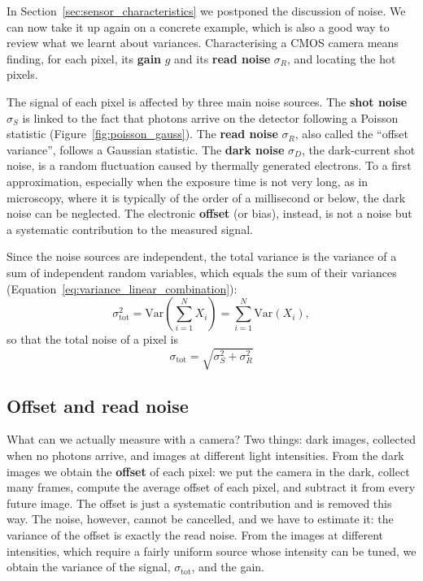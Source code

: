 \documentclass[letterpaper,11pt,leqno]{book}
\begin{document}
In Section~\ref{sec:sensor_characteristics} we postponed the discussion of noise. We can now take it up again on a concrete example, which is also a good way to review what we learnt about variances. Characterising a CMOS camera means finding, for each pixel, its \textbf{gain} $g$ and its \textbf{read noise} $\sigma_R$, and locating the hot pixels.

The signal of each pixel is affected by three main noise sources. The \textbf{shot noise} $\sigma_S$ is linked to the fact that photons arrive on the detector following a Poisson statistic (Figure~\ref{fig:poisson_gauss}). The \textbf{read noise} $\sigma_R$, also called the ``offset variance'', follows a Gaussian statistic. The \textbf{dark noise} $\sigma_D$, the dark-current shot noise, is a random fluctuation caused by thermally generated electrons. To a first approximation, especially when the exposure time is not very long, as in microscopy, where it is typically of the order of a millisecond or below, the dark noise can be neglected. The electronic \textbf{offset} (or bias), instead, is not a noise but a systematic contribution to the measured signal.

Since the noise sources are independent, the total variance is the variance of a sum of independent random variables, which equals the sum of their variances (Equation~\eqref{eq:variance_linear_combination}):
\begin{equation}
\sigma_{\text{tot}}^2 = \text{Var}\left(\sum_{i=1}^{N}X_i\right) = \sum_{i=1}^{N}\text{Var}(X_i),
\end{equation}
so that the total noise of a pixel is
\begin{equation}
\boxed{\sigma_{\text{tot}} = \sqrt{\sigma_S^2 + \sigma_R^2}}
\label{eq:cmos_total_noise}
\end{equation}

\subsection{Offset and read noise}

What can we actually measure with a camera? Two things: dark images, collected when no photons arrive, and images at different light intensities. From the dark images we obtain the \textbf{offset} of each pixel: we put the camera in the dark, collect many frames, compute the average offset of each pixel, and subtract it from every future image. The offset is just a systematic contribution and is removed this way. The noise, however, cannot be cancelled, and we have to estimate it: the variance of the offset is exactly the read noise. From the images at different intensities, which require a fairly uniform source whose intensity can be tuned, we obtain the variance of the signal, $\sigma_{\text{tot}}$, and the gain.
\end{document}
